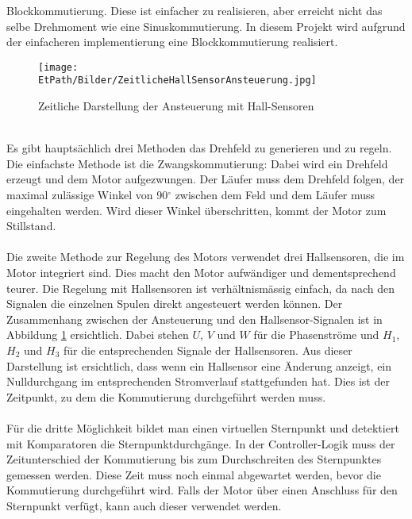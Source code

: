         Blockkommutierung. Diese ist einfacher zu realisieren, aber erreicht 
        nicht das selbe Drehmoment wie eine Sinuskommutierung. In diesem 
        Projekt wird aufgrund der einfacheren implementierung eine 
        Blockkommutierung realisiert. \\
    \ifSTANDALONE
        \begin{figure}[h!]
            \texttt{[image: \\EtPath/Bilder/ZeitlicheHallSensorAnsteuerung.jpg]}
            \centering
            \caption[Zeitliche Darstellung der Ansteuerung mit Hall-Sensoren]
            {Zeitliche Darstellung der Ansteuerung mit Hall-Sensoren \cite{AppNote:BrushlessuC}}
            \label{abb:ZeitlicheAnsteuerungBrushlessMotor}
        \end{figure}
    \fi
        \\
        Es gibt hauptsächlich drei Methoden das Drehfeld zu generieren und zu 
        regeln. Die einfachste Methode ist die Zwangskommutierung: 
        Dabei wird ein Drehfeld erzeugt und dem Motor aufgezwungen. Der Läufer 
        muss dem Drehfeld folgen, der maximal zulässige Winkel von 90$^\circ$
        zwischen dem Feld und dem Läufer muss eingehalten werden. Wird dieser 
        Winkel überschritten, kommt der Motor zum Stillstand.\\
        \\
        Die zweite Methode zur Regelung des Motors verwendet drei Hallsensoren, die im 
        Motor integriert sind. Dies macht den Motor aufwändiger und 
        dementsprechend teurer. Die Regelung mit Hallsensoren ist 
        verhältnismässig einfach, da nach den Signalen die einzelnen Spulen 
        direkt angesteuert werden können. Der Zusammenhang zwischen der 
        Ansteuerung und den Hallsensor-Signalen ist in Abbildung 
        \ref{abb:ZeitlicheAnsteuerungBrushlessMotor} ersichtlich. Dabei stehen 
        $U$, $V$ und $W$ für die Phasenströme und $H_1$, $H_2$ und $H_3$ für die 
        entsprechenden Signale der Hallsensoren. Aus dieser Darstellung ist 
        ersichtlich, dass wenn ein Hallsensor eine Änderung anzeigt, 
        ein Nulldurchgang im entsprechenden Stromverlauf stattgefunden hat. 
        Dies ist der Zeitpunkt, zu dem die Kommutierung durchgeführt werden 
        muss.\\
        \\
        Für die dritte Möglichkeit bildet man einen virtuellen Sternpunkt 
        und detektiert mit Komparatoren die Sternpunktdurchgänge. 
        In der Controller-Logik muss der Zeitunterschied der Kommutierung 
        bis zum Durchschreiten des Sternpunktes gemessen werden. Diese Zeit 
        muss noch einmal abgewartet werden, bevor die Kommutierung durchgeführt 
        wird. Falls der Motor über einen Anschluss für den Sternpunkt 
        verfügt, kann auch dieser verwendet werden. 
\ifSTANDALONE
